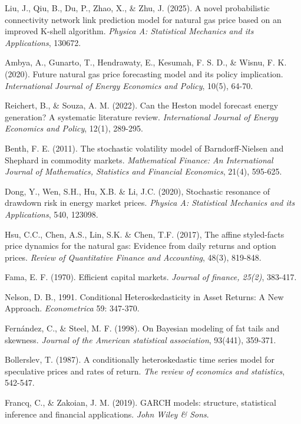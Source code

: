 \documentclass[12pt,a4paper]{article}
\numberwithin{equation}{section}
\begin{document}
\begin{thebibliography}{11}
\bibitem{}
Liu, J., Qiu, B., Du, P., Zhao, X., \& Zhu, J. (2025). A novel probabilistic connectivity network link prediction model for natural gas price based on an improved K-shell algorithm. \emph{Physica A: Statistical Mechanics and its Applications}, 130672.


\bibitem{}
Ambya, A., Gunarto, T., Hendrawaty, E., Kesumah, F. S. D., \& Wisnu, F. K. (2020). Future natural gas price forecasting model and its policy implication. \emph{International Journal of Energy Economics and Policy}, 10(5), 64-70.


\bibitem{}
Reichert, B., \& Souza, A. M. (2022). Can the Heston model forecast energy generation? A systematic literature review. \emph{International Journal of Energy Economics and Policy}, 12(1), 289-295.

\bibitem{}
Benth, F. E. (2011). The stochastic volatility model of Barndorff‐Nielsen and Shephard in commodity markets. \emph{Mathematical Finance: An International Journal of Mathematics, Statistics and Financial Economics}, 21(4), 595-625.

\bibitem{}
Dong,  Y.,  Wen,  S.H.,  Hu,  X.B. \&  Li,  J.C.  (2020),  Stochastic  resonance  of  drawdown  risk  in  energy  market  prices.  \emph{Physica  A:  Statistical  Mechanics and its Applications}, 540, 123098.

\bibitem{}
Hsu, C.C., Chen, A.S., Lin, S.K. \& Chen, T.F. (2017), The affine styled-facts price dynamics for the natural gas: Evidence from daily returns and option prices. \emph{Review of Quantitative Finance and Accounting}, 48(3), 819-848.

\bibitem{}
Fama, E. F. (1970). Efficient capital markets. \emph{Journal of finance, 25(2)}, 383-417.

\bibitem{}
Nelson, D. B., 1991. Conditional Heteroskedasticity in Asset Returns: A New Approach. \emph{Econometrica} 59: 347-370.

\bibitem{}
Fernández, C., \& Steel, M. F. (1998). On Bayesian modeling of fat tails and skewness. \emph{Journal of the American statistical association}, 93(441), 359-371.

\bibitem{}
Bollerslev, T. (1987). A conditionally heteroskedastic time series model for speculative prices and rates of return. \emph{The review of economics and statistics}, 542-547.

\bibitem{}
Francq, C., \& Zakoian, J. M. (2019). GARCH models: structure, statistical inference and financial applications. \emph{John Wiley \& Sons}.


\end{thebibliography}
\end{document}
